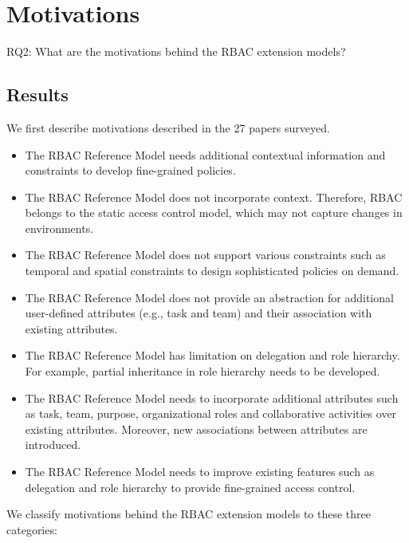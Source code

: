 \section{Motivations} \label{sec:motivations}

RQ2: What are the motivations behind the RBAC extension models?

\subsection{Results}

We first describe motivations described in the 27 papers surveyed.

\begin{itemize}
\setlength{\itemsep}{0.25pt}
\item The RBAC Reference Model needs additional contextual information and constraints to develop fine-grained policies.
\item The RBAC Reference Model does not incorporate context. Therefore, RBAC belongs to the static access control model, which may not capture changes in environments.
\item The RBAC Reference Model does not support various constraints such as temporal and spatial constraints to design sophisticated policies on demand.
\item The RBAC Reference Model does not provide an abstraction for additional user-defined attributes	(e.g., task and team) and their association with existing attributes.
\item The RBAC Reference Model has limitation on delegation and role hierarchy. For example, partial inheritance in role hierarchy needs to be developed.  
\item The RBAC Reference Model needs to incorporate additional attributes such as
task, team, purpose, organizational roles and collaborative activities over existing attributes. Moreover, new associations between attributes
are introduced. 
\item The RBAC Reference Model needs to improve existing features such as delegation and role hierarchy to provide fine-grained access control. 
\end{itemize}


We classify motivations behind the RBAC extension models to these three categories:

